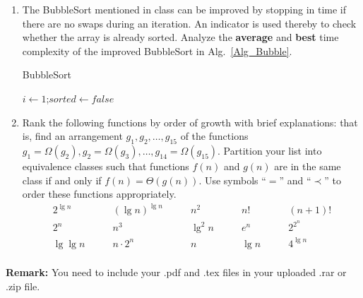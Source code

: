 \documentclass[12pt,a4paper,UTF8]{article}
\makeatletter
\newtheorem*{solution}{Solution}
\theoremstyle{definition}
\renewenvironment{solution}[1][Solution] {\par\pushQED{\qed}\normalfont\topsep6\p@\@plus6\p@\relax\trivlist\item[\hskip\labelsep\bfseries#1\@addpunct{.}]\ignorespaces}{\popQED\endtrivlist\@endpefalse} \makeatother
\makeatother
\begin{document}
\begin{enumerate}
    \item
    The BubbleSort mentioned in class can be improved by stopping in time if there are no swaps during an iteration. An indicator is used thereby to check whether the array is already sorted. Analyze the \textbf{average} and \textbf{best} time complexity of the improved BubbleSort in Alg.~\ref{Alg_Bubble}.

    \begin{minipage}[t]{0.8\textwidth}
    \begin{algorithm}[H]

        \BlankLine
        \caption{BubbleSort}\label{Alg_Bubble}

        $i\leftarrow 1$;$sorted\leftarrow false$\;

    \end{algorithm}
    \end{minipage}


    \item

    Rank the following functions by order of growth with brief explanations: that is, find an arrangement $g_1, g_2, \ldots , g_{15}$ of the functions $g_1 = \Omega(g_2), g_2 = \Omega(g_3), \ldots, g_{14} = \Omega(g_{15})$.  Partition your list into equivalence classes such that functions $f(n)$ and $g(n)$ are in the same class if and only if $f(n) = \Theta(g(n))$. Use symbols ``$=$'' and ``$\prec$'' to order these functions appropriately.
    $$
    \begin{array}{ccccc}
        2^{\lg n} \quad & \quad (\lg n)^{\lg n} \quad & \quad n^2 \quad & \quad n! \quad & \quad (n + 1)! \\
        2^n \quad & \quad n^3 \quad & \quad \lg^2 n \quad & \quad e^n \quad & \quad 2^{2^n} \\
        \lg\lg n \quad & \quad n\cdot 2^n \quad & \quad n \quad & \quad \lg n \quad & \quad 4^{\lg n} \\
    \end{array}
    $$


\end{enumerate}

\vspace{20pt}

\textbf{Remark:} You need to include your .pdf and .tex files in your uploaded .rar or .zip file.

\end{document}
